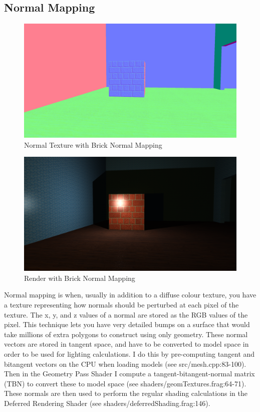 \documentclass{book}
\begin{document}
    \subsection{Normal Mapping} \label{normal-mapping}
      \begin{figure}[h!]
        \centering
        \includegraphics[width=1.0\textwidth]{normal_mapping_normal}
        \caption{Normal Texture with Brick Normal Mapping}
      \end{figure}

      \begin{figure}[h!]
        \centering
        \includegraphics[width=1.0\textwidth]{normal_mapping_accum}
        \caption{Render with Brick Normal Mapping}
        \label{brick-normal-map}
      \end{figure}

      Normal mapping is when, usually in addition to a diffuse colour texture, you have a texture representing how normals should be perturbed at each pixel of the texture. The x, y, and z values of a normal are stored as the RGB values of the pixel. This technique lets you have very detailed bumps on a surface that would take millions of extra polygons to construct using only geometry. These normal vectors are stored in tangent space, and have to be converted to model space in order to be used for lighting calculations. I do this by pre-computing tangent and bitangent vectors on the CPU when loading models (see src/mesh.cpp:83-100). Then in the Geometry Pass Shader I compute a tangent-bitangent-normal matrix (TBN) to convert these to model space (see shaders/geomTextures.frag:64-71). These normals are then used to perform the regular shading calculations in the Deferred Rendering Shader (see shaders/deferredShading.frag:146).
\end{document}
